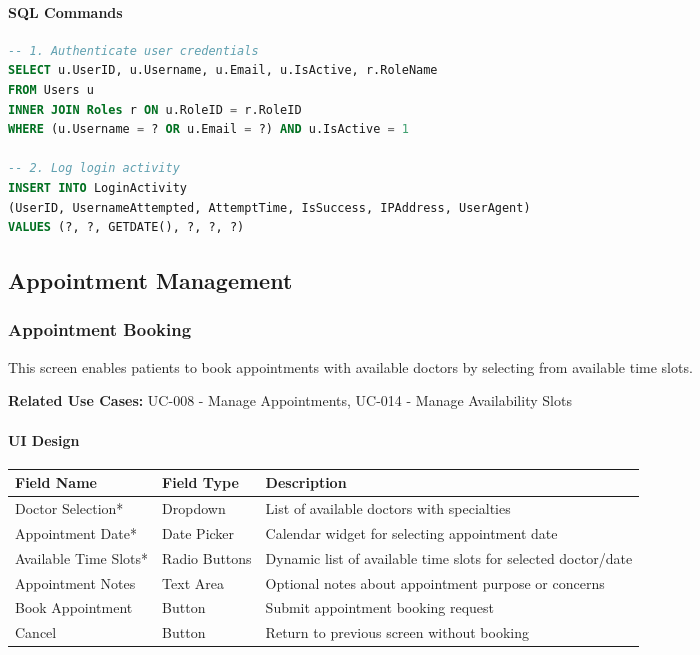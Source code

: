 \documentclass[12pt,a4paper]{article}
\begin{document}
\paragraph{SQL Commands}

\begin{lstlisting}[language=SQL]
-- 1. Authenticate user credentials
SELECT u.UserID, u.Username, u.Email, u.IsActive, r.RoleName
FROM Users u 
INNER JOIN Roles r ON u.RoleID = r.RoleID
WHERE (u.Username = ? OR u.Email = ?) AND u.IsActive = 1

-- 2. Log login activity
INSERT INTO LoginActivity 
(UserID, UsernameAttempted, AttemptTime, IsSuccess, IPAddress, UserAgent)
VALUES (?, ?, GETDATE(), ?, ?, ?)
\end{lstlisting}

\subsection{Appointment Management}

\subsubsection{Appointment Booking}

This screen enables patients to book appointments with available doctors by selecting from available time slots.

\textbf{Related Use Cases:} UC-008 - Manage Appointments, UC-014 - Manage Availability Slots

\paragraph{UI Design}

\begin{longtable}{|p{3cm}|p{3cm}|p{8cm}|}
\hline
\textbf{Field Name} & \textbf{Field Type} & \textbf{Description} \\
\hline
Doctor Selection* & Dropdown & List of available doctors with specialties \\
\hline
Appointment Date* & Date Picker & Calendar widget for selecting appointment date \\
\hline
Available Time Slots* & Radio Buttons & Dynamic list of available time slots for selected doctor/date \\
\hline
Appointment Notes & Text Area & Optional notes about appointment purpose or concerns \\
\hline
Book Appointment & Button & Submit appointment booking request \\
\hline
Cancel & Button & Return to previous screen without booking \\
\hline
\end{longtable}
\end{document}

